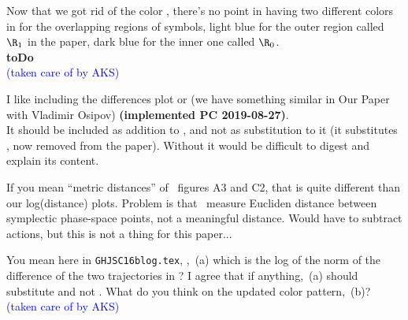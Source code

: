 \begin{description}
  { %
Now that we got rid of the color , there's no
point in having two different colors in  for
the overlapping regions of symbols, light blue for the outer region
called $\R_{1}$  in the paper, dark blue for the inner one called
$\R_{0}$.
\\ {\bf toDo}
\\ \textcolor{blue}{(taken care of by AKS)}
    }

  {	
I like including the differences plot 
or 
(we have something similar in Our Paper with Vladimir
Osipov)
{\bf (implemented PC 2019-08-27)}.\\
It should be included as addition to , and not
as substitution to it (it substitutes , now
removed from the paper). Without  it would be
difficult to digest and explain its content.}


  {
If you mean ``metric distances'' of \GO\ figures A3 and C2, that is quite
different than our log(distance) plots. Problem is that \GO\ measure
Eucliden distance between symplectic phase-space points, not a meaningful
distance. Would have to subtract actions, but this is not a thing for
this paper...
    }

 {
You mean  here in \texttt{GHJSC16blog.tex}, \ie,
\,(a) which is the log of the norm of the
difference of the two trajectories in \statesp? I agree that if
anything, \,(a) should substitute
 and not .
What do you think on the updated color pattern,
\,(b)?
\\ \textcolor{blue}{(taken care of by AKS)}
    }


\end{description}
